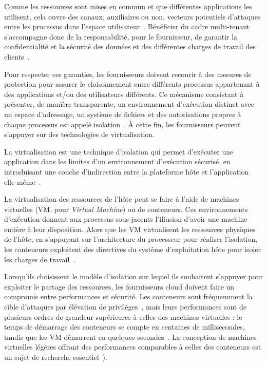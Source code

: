 Comme les ressources sont mises en commun et que différentes applications les utilisent, cela ouvre des canaux, auxiliaires ou non, vecteurs potentiels d'attaques entre les processus dans l'espace utilisateur~\cite{pedersen2017trash, wu2018side}. Bénéficier du cadre multi-tenant s'accompagne donc de la responsabilité, pour le fournisseur, de garantir la confidentialité et la sécurité des données et des différentes charges de travail des clients~\cite{vaqueroLockingSkySurvey2011}.

Pour respecter ces garanties, les fournisseurs doivent recourir à des mesures de protection pour assurer le cloisonnement entre différents processus appartenant à des applications et/ou des utilisateurs différents. Ce mécanisme consistant à présenter, de manière transparente, un environnement d'exécution distinct avec un espace d'adressage, un système de fichiers et des autorisations propres à chaque processus est appelé isolation~\cite{fehlingCloudComputingPatterns2014}. À cette fin, les fournisseurs peuvent s'appuyer sur des technologies de virtualisation.

La virtualisation est une technique d'isolation qui permet d'exécuter une application dans les limites d'un environnement d'exécution sécurisé, en introduisant une couche d'indirection entre la plateforme hôte et l'application elle-même~\cite{singhviAtollScalableLowLatency2021}.

La virtualisation des ressources de l'hôte peut se faire à l'aide de machines virtuelles (\gls{VM}, pour \textit{Virtual Machine}) ou de conteneurs. Ces environnements d'exécution donnent aux processus sous-jacents l'illusion d'avoir une machine entière à leur disposition. Alors que les VM virtualisent les ressources physiques de l'hôte, en s'appuyant sur l'architecture du processeur pour réaliser l'isolation, les conteneurs exploitent des directives du système d'exploitation hôte pour isoler les charges de travail~\cite{mancoMyVMLighter2017}.

Lorsqu'ils choisissent le modèle d'isolation sur lequel ils souhaitent s'appuyer pour exploiter le partage des ressources, les fournisseurs cloud doivent faire un compromis entre performances et sécurité. Les conteneurs sont fréquemment la cible d'attaques par élévation de privilèges~\cite{zomer2022containers, redhat2019containers}, mais leurs performances sont de plusieurs ordres de grandeur supérieures à celles des machines virtuelles : le temps de démarrage des conteneurs se compte en centaines de millisecondes, tandis que les VM démarrent en quelques secondes~\cite{mancoMyVMLighter2017}. La conception de machines virtuelles légères offrant des performances comparables à celles des conteneurs est un sujet de recherche essentiel~\cite{agacheFirecrackerLightweightVirtualization, Anjali2020BlendingCA}).

